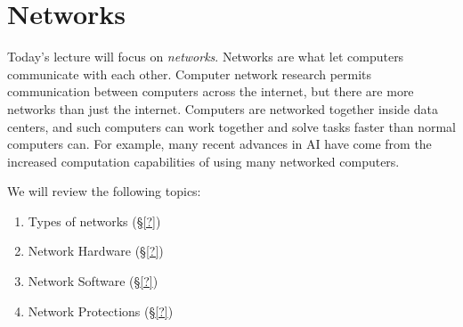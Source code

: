 \chapter{Networks}

Today's lecture will focus on \emph{networks}. Networks are what let computers
communicate with each other. Computer network research permits communication
between computers across the internet, but there are more networks than just the
internet. Computers are networked together inside data centers, and such
computers can work together and solve tasks faster than normal computers can.
For example, many recent advances in AI have come from the increased computation
capabilities of using many networked computers.

We will review the following topics:
\begin{enumerate}
\item Types of networks (\S\ref{?})
\item Network Hardware (\S\ref{?})
\item Network Software (\S\ref{?})
\item Network Protections (\S\ref{?})
\end{enumerate}

